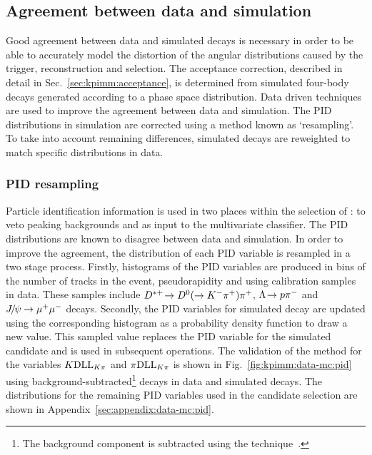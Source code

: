 \subsection{Agreement between data and simulation}
\label{sec:kpimm:data-mc}

Good agreement between data and simulated decays is necessary in order to be able to accurately model the distortion of the angular distributions caused by the trigger, reconstruction and selection. The acceptance correction, described in detail in Sec.~\ref{sec:kpimm:acceptance}, is determined from simulated four-body \BdToKpimm decays generated according to a phase space distribution. Data driven techniques are used to improve the agreement between data and simulation. The PID distributions in simulation are corrected using a method known as `resampling'. To take into account remaining differences, simulated decays are reweighted to match specific distributions in data.

\subsubsection{PID resampling}
\label{sec:kpimm:data-mc:resample}

Particle identification information is used in two places within the selection of \BdToKpimm: to veto peaking backgrounds and as input to the multivariate classifier. The PID distributions are known to disagree between data and simulation. In order to improve the agreement, the distribution of each PID variable is resampled in a two stage process. Firstly, histograms of the PID variables are produced in bins of the number of tracks in the event, pseudorapidity and \pt using calibration samples in data. These samples include ${{D}^{*+}}\!\rightarrow {\ensuremath{{D}^0}}(\rightarrow{\ensuremath{{K}^-}}{\ensuremath{{\pi}^+}}){{\pi}^+}$, ${\Lambda}\!\rightarrow {\ensuremath{p}}{\ensuremath{{\pi}^-}}$ and ${{J\mskip -3mu/\mskip -2mu\psi\mskip 2mu}}\!\rightarrow {\ensuremath{\mu^+\mu^-}}$ decays. Secondly, the PID variables for simulated decay are updated using the corresponding histogram as a probability density function to draw a new value. This sampled value replaces the PID variable for the simulated candidate and is used in subsequent operations. The validation of the method for the variables ${K}\mathrm{DLL}_{{K}{\pi}}$ and ${\pi}\mathrm{DLL}_{{K}{\pi}}$ is shown in Fig.~\ref{fig:kpimm:data-mc:pid} using background-subtracted\footnote{The background component is subtracted using the \sPlot technique~\cite{splot}.} \BdToJPsiKst decays in data and simulated \BdToJPsiKst decays. The distributions for the remaining PID variables used in the candidate selection are shown in Appendix~\ref{sec:appendix:data-mc:pid}.

